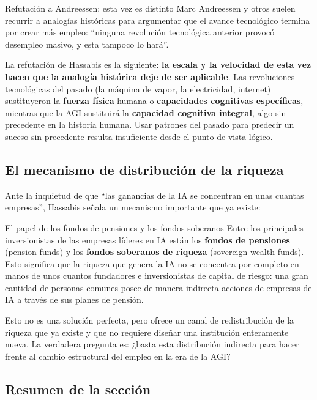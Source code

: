 \documentclass[a4paper]{article}
\begin{document}
\begin{warningbox}{Refutación a Andreessen: esta vez es distinto}
Marc Andreessen y otros suelen recurrir a analogías históricas para argumentar que el avance tecnológico termina por crear más empleo: ``ninguna revolución tecnológica anterior provocó desempleo masivo, y esta tampoco lo hará''.

La refutación de Hassabis es la siguiente: \textbf{la escala y la velocidad de esta vez hacen que la analogía histórica deje de ser aplicable}. Las revoluciones tecnológicas del pasado (la máquina de vapor, la electricidad, internet) sustituyeron la \textbf{fuerza física} humana o \textbf{capacidades cognitivas específicas}, mientras que la AGI sustituirá la \textbf{capacidad cognitiva integral}, algo sin precedente en la historia humana. Usar patrones del pasado para predecir un suceso sin precedente resulta insuficiente desde el punto de vista lógico.
\end{warningbox}

\subsection{El mecanismo de distribución de la riqueza}

Ante la inquietud de que ``las ganancias de la IA se concentran en unas cuantas empresas'', Hassabis señala un mecanismo importante que ya existe:

\begin{knowledgebox}{El papel de los fondos de pensiones y los fondos soberanos}
Entre los principales inversionistas de las empresas líderes en IA están los \textbf{fondos de pensiones} (pension funds) y los \textbf{fondos soberanos de riqueza} (sovereign wealth funds). Esto significa que la riqueza que genera la IA no se concentra por completo en manos de unos cuantos fundadores e inversionistas de capital de riesgo: una gran cantidad de personas comunes posee de manera indirecta acciones de empresas de IA a través de sus planes de pensión.

Esto no es una solución perfecta, pero ofrece un canal de redistribución de la riqueza que ya existe y que no requiere diseñar una institución enteramente nueva. La verdadera pregunta es: ¿basta esta distribución indirecta para hacer frente al cambio estructural del empleo en la era de la AGI?
\end{knowledgebox}

\subsection{Resumen de la sección}
\end{document}
